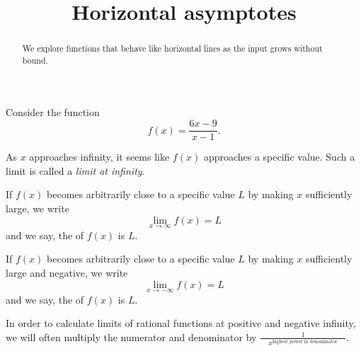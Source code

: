 \documentclass{ximera}
\title[Dig-In:]{Horizontal asymptotes}
\begin{document}
\begin{abstract}
We explore functions that behave like horizontal lines as the input
grows without bound.
\end{abstract}
\maketitle



Consider the function
\[
f(x) = \frac{6x-9}{x-1}.
\]
\begin{image}
\end{image}
As $x$ approaches infinity, it seems like $f(x)$ approaches a specific
value. Such a limit is called a \textit{limit at infinity}.


\begin{definition}\label{def:limitAtInfty}
If $f(x)$ becomes arbitrarily close to a specific value $L$ by making
$x$ sufficiently large, we write
\[
\lim_{x\to \infty} f(x) = L
\]
and we say, the  of $f(x)$ is $L$.  

If $f(x)$ becomes arbitrarily close to a specific value $L$ by making
$x$ sufficiently large and negative, we write
\[
\lim_{x\to -\infty} f(x) = L
\]
and we say, the  of $f(x)$ is $L$.  
\end{definition}

In order to calculate limits of rational functions at positive and negative infinity, we will often multiply the numerator and denominator by $\displaystyle\frac{1}{\phantom{xx}x^{\text{highest power in denominator}}\phantom{xx}}$.
\end{document}
